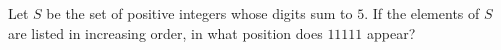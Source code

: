 Let $S$ be the set of positive integers whose digits sum to $5$. If the elements of $S$ are listed in increasing order, in what position does $11111$ appear?
